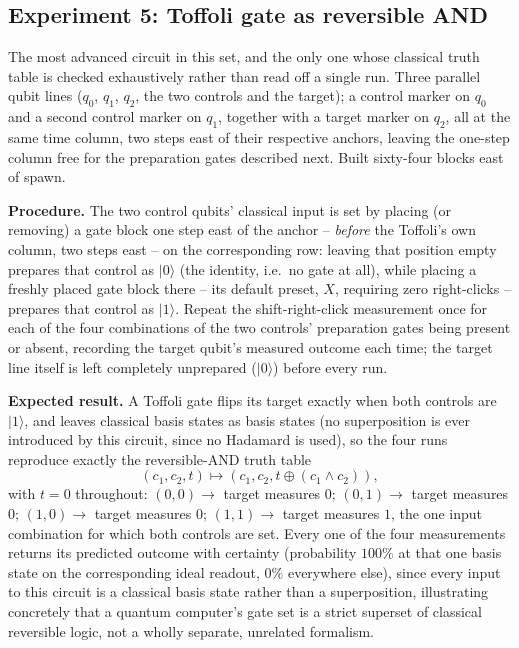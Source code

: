 \subsection{Experiment 5: Toffoli gate as reversible AND}
\label{sec:exp-toffoli}

The most advanced circuit in this set, and the only one whose classical truth table is
checked exhaustively rather than read off a single run. Three parallel qubit lines ($q_0$,
$q_1$, $q_2$, the two controls and the target); a control marker on $q_0$ and a second control
marker on $q_1$, together with a target marker on $q_2$, all at the same time column, two steps
east of their respective anchors, leaving the one-step column free for the preparation gates
described next. Built sixty-four blocks east of spawn.

\textbf{Procedure.} The two control qubits' classical input is set by placing (or removing) a
gate block one step east of the anchor -- \emph{before} the Toffoli's own column, two steps
east -- on the corresponding row: leaving that position empty prepares that control as
$|0\rangle$ (the identity, i.e.\ no gate at all), while placing a freshly placed gate block
there -- its default preset, $X$, requiring zero right-clicks -- prepares that control as
$|1\rangle$. Repeat the shift-right-click
measurement once for each of the four combinations of the two controls' preparation gates
being present or absent, recording the target qubit's measured outcome each time; the target
line itself is left completely unprepared ($|0\rangle$) before every run.

\textbf{Expected result.} A Toffoli gate flips its target exactly when both controls are
$|1\rangle$, and leaves classical basis states as basis states (no superposition is ever
introduced by this circuit, since no Hadamard is used), so the four runs reproduce exactly the
reversible-AND truth table~\cite{toffoli1980reversible}
\begin{equation}
(c_1, c_2, t) \mapsto (c_1, c_2, t \oplus (c_1 \wedge c_2)),
\end{equation}
with $t=0$ throughout: $(0,0)\to$ target measures $0$; $(0,1)\to$ target measures $0$;
$(1,0)\to$ target measures $0$; $(1,1)\to$ target measures $1$, the one input combination for
which both controls are set. Every one of the four measurements returns its predicted outcome
with certainty (probability $100\%$ at that one basis state on the corresponding ideal
readout, $0\%$ everywhere else), since every input to this circuit is a classical basis state
rather than a superposition, illustrating concretely that a quantum computer's gate set is a
strict superset of classical reversible logic, not a wholly separate, unrelated formalism.
